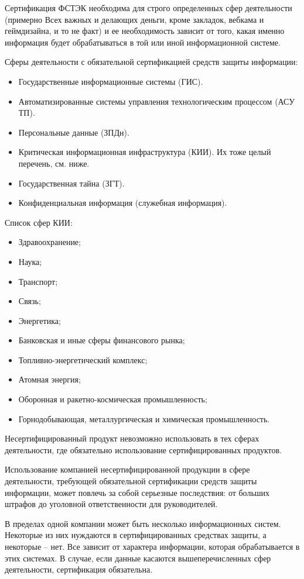 Сертификация ФСТЭК необходима для строго определенных сфер деятельности (примерно Всех важных и делающих деньги, кроме закладок, вебкама и геймдизайна, и то не факт) и ее необходимость зависит от того, какая именно информация будет обрабатываться в той или иной информационной системе.

Сферы деятельности с обязательной сертификацией средств защиты информации:
\begin{itemize}
    \item Государственные информационные системы (ГИС).
    \item Автоматизированные системы управления технологическим процессом (АСУ ТП).
    \item Персональные данные (ЗПДн).
    \item Критическая информационная инфраструктура (КИИ). Их тоже целый перечень, см. ниже.
    \item Государственная тайна (ЗГТ).
    \item Конфиденциальная информация (служебная информация).
\end{itemize}

Список сфер КИИ:
\begin{itemize}
    \item Здравоохранение;
    \item Наука;
    \item Транспорт;
    \item Связь;
    \item Энергетика;
    \item Банковская и иные сферы финансового рынка;
    \item Топливно-энергетический комплекс;
    \item Атомная энергия;
    \item Оборонная и ракетно-космическая промышленность;
    \item Горнодобывающая, металлургическая и химическая промышленность.
\end{itemize}

Несертифицированный продукт невозможно использовать в тех сферах деятельности, где обязательно использование сертифицированных продуктов.

Использование компанией несертифицированной продукции в сфере деятельности, требующей обязательной сертификации средств защиты информации, может повлечь за собой серьезные последствия: от больших штрафов до уголовной ответственности для руководителей.

В пределах одной компании может быть несколько информационных систем. Некоторые из них нуждаются в сертифицированных средствах защиты, а некоторые – нет. Все зависит от характера информации, которая обрабатывается в этих системах. В случае, если данные касаются вышеперечисленных сфер деятельности, сертификация обязательна.

